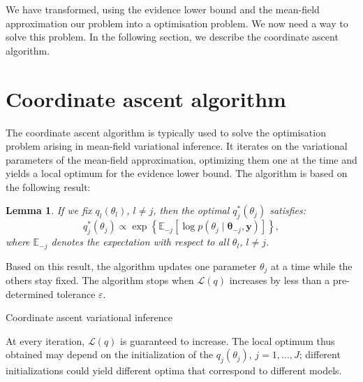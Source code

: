 \documentclass[a4paper, 11pt]{report}
\numberwithin{equation}{chapter}
\newtheorem{lemma}{Lemma}[chapter]
\begin{document}
We have transformed, using the evidence lower bound and the mean-field approximation our problem into a optimisation problem. We now need a way to solve this problem. In the following section, we describe the coordinate ascent algorithm.
\section{Coordinate ascent algorithm}
The coordinate ascent algorithm is typically used to solve the optimisation problem arising in mean-field variational inference. It iterates on the variational parameters of the mean-field approximation, optimizing them one at the time and yields a local optimum for the evidence lower bound. The algorithm is based on the following result:
\begin{lemma}

If we fix $q_l(\theta_l)$, $l\neq j$, then the optimal $q^*_j(\theta_j)$ satisfies:
\begin{equation*}
q^*_j(\theta_j) \propto \exp\left\lbrace\mathbb{E}_{-j}\left[\log p(\theta_j \mid \boldsymbol{\theta}_{-j}, \boldsymbol{y})\right]\right\rbrace,
\end{equation*}
where $\mathbb{E}_{-j}$ denotes the expectation with respect to all $\theta_l$, $l \neq j$.
\end{lemma}

Based on this result, the algorithm updates one parameter $\theta_j$ at a time while the others stay fixed. The algorithm stops when $\mathcal{L}(q)$ increases by less than a pre-determined tolerance $\varepsilon$.

\begin{algorithm}
\BlankLine
{}
\BlankLine
{}
\BlankLine
{}
\caption{\label{alg:CAVI}Coordinate ascent variational inference}
\end{algorithm}
At every iteration, $\mathcal{L}(q)$ is guaranteed to increase. The local optimum thus obtained may depend on the initialization of the $q_j(\theta_j)$, $j=1,\ldots,J$; different initializations could yield different optima that correspond to different models.
\end{document}

